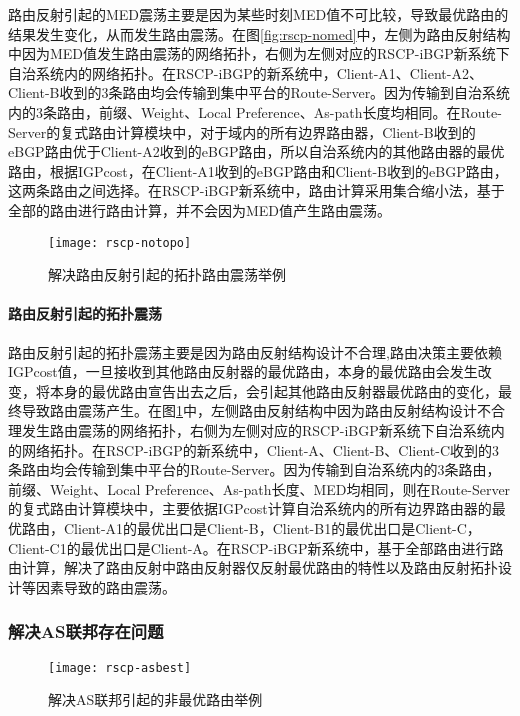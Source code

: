 路由反射引起的MED震荡主要是因为某些时刻MED值不可比较，导致最优路由的结果发生变化，从而发生路由震荡。在图\ref{fig:rscp-nomed}中，左侧为路由反射结构中因为MED值发生路由震荡的网络拓扑，右侧为左侧对应的RSCP-iBGP新系统下自治系统内的网络拓扑。在RSCP-iBGP的新系统中，Client-A1、Client-A2、Client-B收到的3条路由均会传输到集中平台的Route-Server。因为传输到自治系统内的3条路由，前缀、Weight、Local Preference、As-path长度均相同。在Route-Server的复式路由计算模块中，对于域内的所有边界路由器，Client-B收到的eBGP路由优于Client-A2收到的eBGP路由，所以自治系统内的其他路由器的最优路由，根据IGPcost，在Client-A1收到的eBGP路由和Client-B收到的eBGP路由，这两条路由之间选择。在RSCP-iBGP新系统中，路由计算采用集合缩小法，基于全部的路由进行路由计算，并不会因为MED值产生路由震荡。\\


\begin{figure}
  \centering
  \texttt{[image: rscp-notopo]}
  \caption{解决路由反射引起的拓扑路由震荡举例}
  \label{fig:rscp-notopo}
\end{figure}

\paragraph{路由反射引起的拓扑震荡}

路由反射引起的拓扑震荡主要是因为路由反射结构设计不合理,路由决策主要依赖IGPcost值，一旦接收到其他路由反射器的最优路由，本身的最优路由会发生改变，将本身的最优路由宣告出去之后，会引起其他路由反射器最优路由的变化，最终导致路由震荡产生。在图\ref{fig:rscp-notopo}中，左侧路由反射结构中因为路由反射结构设计不合理发生路由震荡的网络拓扑，右侧为左侧对应的RSCP-iBGP新系统下自治系统内的网络拓扑。在RSCP-iBGP的新系统中，Client-A、Client-B、Client-C收到的3条路由均会传输到集中平台的Route-Server。因为传输到自治系统内的3条路由，前缀、Weight、Local Preference、As-path长度、MED均相同，则在Route-Server的复式路由计算模块中，主要依据IGPcost计算自治系统内的所有边界路由器的最优路由，Client-A1的最优出口是Client-B，Client-B1的最优出口是Client-C，Client-C1的最优出口是Client-A。在RSCP-iBGP新系统中，基于全部路由进行路由计算，解决了路由反射中路由反射器仅反射最优路由的特性以及路由反射拓扑设计等因素导致的路由震荡。

\subsubsection{解决AS联邦存在问题}


\begin{figure}
  \centering
  \texttt{[image: rscp-asbest]}
  \caption{解决AS联邦引起的非最优路由举例}
  \label{fig:rscp-asbest}
\end{figure}

